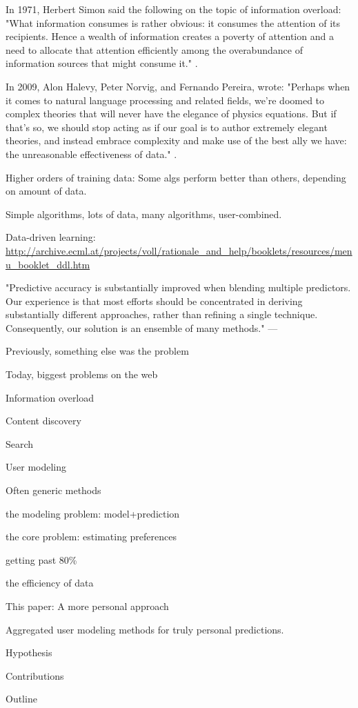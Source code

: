 In 1971, Herbert Simon said the following on the topic of information overload: 
"What information consumes is rather obvious: it consumes the attention of its recipients. 
Hence a wealth of information creates a poverty of attention and 
a need to allocate that attention efficiently among the overabundance of 
information sources that might consume it." \cite{Greenberger1971}.


In 2009, Alon Halevy, Peter Norvig, and Fernando Pereira, wrote:
"Perhaps when it comes to natural language processing and related fields, 
we’re doomed to complex theories that will never have the elegance of physics equations. 
But if that’s so, we should stop acting as if our goal is to author extremely elegant theories, 
and instead embrace complexity and make use of the best ally we have: 
the unreasonable effectiveness of data."
\cite{Halevy2009}.

Higher orders of training data:
Some algs perform better than others, depending on amount of data.
\cite{Banko2001}

Simple algorithms, lots of data, many algorithms, user-combined.

Data-driven learning:
\url{http://archive.ecml.at/projects/voll/rationale_and_help/booklets/resources/menu_booklet_ddl.htm}

"Predictive accuracy is substantially improved when blending multiple predictors. 
Our experience is that most efforts should be concentrated in deriving substantially 
different approaches, rather than refining a single technique. 
Consequently, our solution is an ensemble of many methods."
--- \cite{Bell2007}



Previously, something else was the problem

Today, biggest problems on the web

Information overload

Content discovery

Search

User modeling

Often generic methods

the modeling problem: model+prediction

the core problem: estimating preferences

getting past 80\%

the efficiency of data

This paper: A more personal approach

Aggregated user modeling methods for 
truly personal predictions.

Hypothesis

Contributions

Outline


